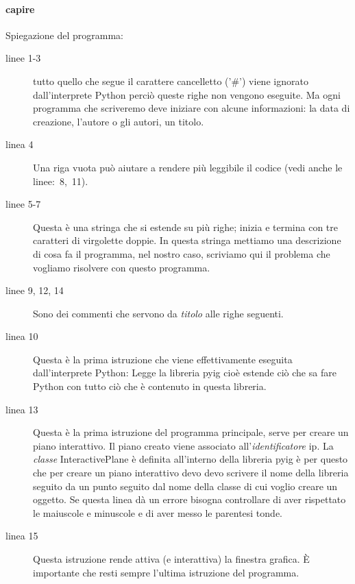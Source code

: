 

\paragraph{capire}
Spiegazione del programma:

\begin{description}
 \item [linee 1-3] 
 tutto quello che segue il carattere cancelletto ('\#') viene ignorato 
dall'interprete Python perciò queste righe non vengono eseguite. Ma ogni 
programma che scriveremo deve iniziare con alcune informazioni: 
la data di creazione, l'autore o gli autori, un titolo.
 \item [linea 4]
 Una riga vuota può aiutare a rendere più leggibile il codice (vedi anche le 
linee:~8,~11).
 \item [linee 5-7]
 Questa è una stringa che si estende su più righe; inizia e termina con tre 
caratteri di virgolette doppie. In questa stringa mettiamo una descrizione di 
cosa fa il programma, nel nostro caso, scriviamo qui il problema che vogliamo 
risolvere con questo programma.
 \item [linee 9, 12, 14]
 Sono dei commenti che servono da \emph{titolo} alle righe seguenti.
 \item [linea 10]
 Questa è la prima istruzione che viene effettivamente eseguita 
dall'interprete Python: Legge la libreria {\ttfamily pyig} cioè estende ciò 
che sa fare Python con tutto ciò che è contenuto in questa libreria. 
 \item [linea 13]
 Questa è la prima istruzione del programma principale, serve per creare un 
piano interattivo. Il piano creato viene associato all'\emph{identificatore}
{\ttfamily ip}. La \emph{classe} {\ttfamily InteractivePlane} è definita 
all'interno della libreria {\ttfamily pyig} è per questo che per creare un 
piano interattivo devo devo scrivere il nome della libreria seguito da un punto 
seguito dal nome della classe di cui voglio creare un oggetto. Se 
questa linea dà un errore bisogna controllare di aver rispettato le maiuscole e 
minuscole e di aver messo le parentesi tonde. 
 \item [linea 15]
 Questa istruzione rende attiva (e interattiva) la finestra grafica. È 
importante che resti sempre l'ultima istruzione del programma.
\end{description}

